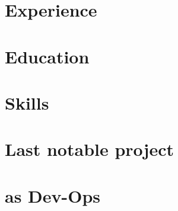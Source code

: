 \def\sitepage{tooling}
\section{Experience}





\section{Education}







\clearpage




\section{Skills}
\begin{cvcolumns}
  
  
  
\end{cvcolumns}


\section{Last notable project}




\section{\textmd{as} Dev-Ops}

